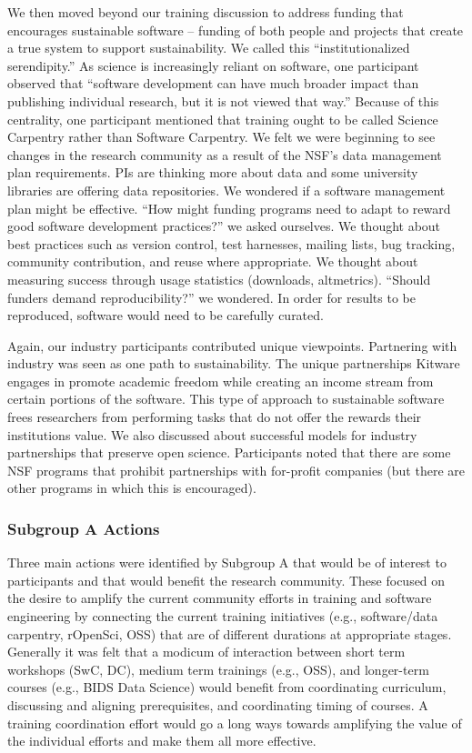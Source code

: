 \documentclass[11pt, oneside]{amsart}
\begin{document}
We then moved beyond our training discussion to address funding that encourages
sustainable software -- funding of both people and projects that create a true
system to support sustainability. We called this ``institutionalized
serendipity.'' As science is increasingly reliant on software, one participant
observed that ``software development can have much broader impact than
publishing individual research, but it is not viewed that way.'' Because of this
centrality, one participant mentioned that training ought to be called Science
Carpentry rather than Software Carpentry. We felt we were beginning to see
changes in the research community as a result of the NSF's data management plan
requirements. PIs are thinking more about data and some university libraries are
offering data repositories. We wondered if a software management plan might be
effective. ``How might funding programs need to adapt to reward good software
development practices?'' we asked ourselves. We thought about best practices
such as version control, test harnesses, mailing lists, bug tracking, community
contribution, and reuse where appropriate. We thought about measuring success
through usage statistics (downloads, altmetrics). ``Should funders demand
reproducibility?'' we wondered. In order for results to be reproduced, software
would need to be carefully curated.

Again, our industry participants contributed unique viewpoints. Partnering with
industry was seen as one path to sustainability. The unique partnerships Kitware
engages in promote academic freedom while creating an income stream from certain
portions of the software. This type of approach to sustainable software frees
researchers from performing tasks that do not offer the rewards their
institutions value. We also discussed about successful models for industry
partnerships that preserve open science. Participants noted that there are some
NSF programs that prohibit partnerships with for-profit companies (but there are
other programs in which this is encouraged).


\subsubsection{Subgroup A Actions}

Three main actions were identified by Subgroup A that would be of interest to participants and that
would benefit the research community.  These focused on the desire to amplify the
current community efforts in training and software engineering by connecting the current training initiatives
(e.g., software/data carpentry, rOpenSci, OSS) that are of different durations at appropriate stages. Generally it
was felt that a modicum of interaction between short term workshops (SwC, DC), medium term trainings (e.g., OSS),
and longer-term courses (e.g., BIDS Data Science) would benefit from coordinating curriculum,
discussing and aligning prerequisites, and coordinating timing of courses.  A training
coordination effort would go a long ways towards amplifying the value of the individual
efforts and make them all more effective.
\end{document}
